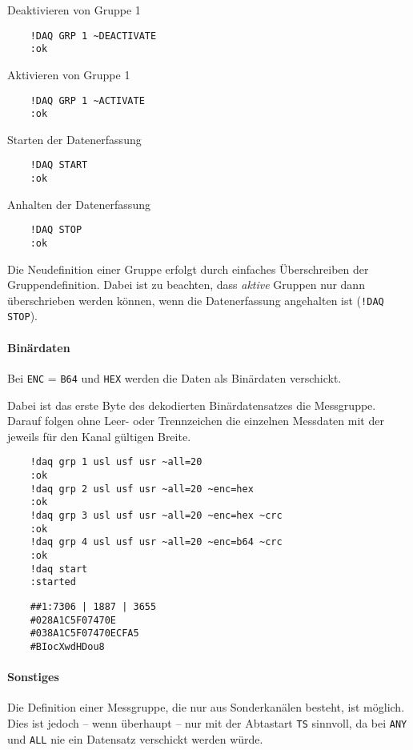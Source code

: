 Deaktivieren von Gruppe 1
\begin{verbatim}
	!DAQ GRP 1 ~DEACTIVATE
	:ok
\end{verbatim}

Aktivieren von Gruppe 1
\begin{verbatim}
	!DAQ GRP 1 ~ACTIVATE
	:ok
\end{verbatim}

Starten der Datenerfassung
\begin{verbatim}
	!DAQ START
	:ok
\end{verbatim}

Anhalten der Datenerfassung
\begin{verbatim}
	!DAQ STOP
	:ok
\end{verbatim}



Die Neudefinition einer Gruppe erfolgt durch einfaches Überschreiben der Gruppendefinition. Dabei ist zu beachten, dass \emph{aktive} Gruppen nur dann überschrieben werden können, wenn die Datenerfassung angehalten ist (\texttt{!DAQ STOP}).


\paragraph{Binärdaten}
Bei \verb|ENC| = \verb|B64| und \verb|HEX| werden die Daten als Binärdaten verschickt.

Dabei ist das erste Byte des dekodierten Binärdatensatzes die Messgruppe. Darauf folgen ohne Leer- oder Trennzeichen die einzelnen Messdaten mit der jeweils für den Kanal gültigen Breite.


\begin{verbatim}
	!daq grp 1 usl usf usr ~all=20
	:ok
	!daq grp 2 usl usf usr ~all=20 ~enc=hex
	:ok
	!daq grp 3 usl usf usr ~all=20 ~enc=hex ~crc
	:ok
	!daq grp 4 usl usf usr ~all=20 ~enc=b64 ~crc
	:ok
	!daq start
	:started
\end{verbatim}

\begin{verbatim}
	##1:7306 | 1887 | 3655
	#028A1C5F07470E
	#038A1C5F07470ECFA5
	#BIocXwdHDou8
\end{verbatim}


\paragraph{Sonstiges}

Die Definition einer Messgruppe, die nur aus Sonderkanälen besteht, ist möglich. Dies ist jedoch -- wenn überhaupt -- nur mit der Abtastart \verb|TS| sinnvoll, da bei \verb|ANY| und \verb|ALL| nie ein Datensatz verschickt werden würde.

